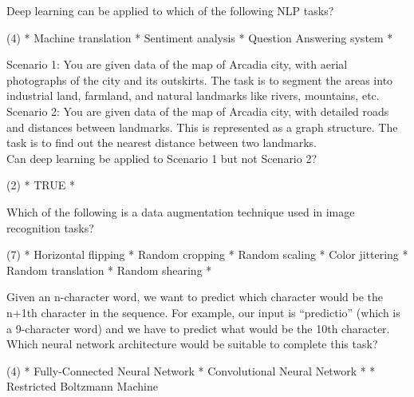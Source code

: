 \documentclass[10pt]{extarticle}
\begin{document}
\begin{exercise}
    Deep learning can be applied to which of the following NLP tasks?
    \begin{choice} (4)
        * Machine translation
        * Sentiment analysis
        * Question Answering system
        *
    \end{choice}
\end{exercise}
\begin{solution}
\end{solution}

\begin{exercise}
    Scenario 1: You are given data of the map of Arcadia city, with aerial photographs of the city and its outskirts. The task is to segment the areas into industrial land, farmland, and natural landmarks like rivers, mountains, etc. \\

    Scenario 2: You are given data of the map of Arcadia city, with detailed roads and distances between landmarks. This is represented as a graph structure. The task is to find out the nearest distance between two landmarks.\\

    Can deep learning be applied to Scenario 1 but not Scenario 2?
    \begin{choice} (2)
        * TRUE
        *
    \end{choice}
\end{exercise}
\begin{solution}
\end{solution}

\begin{exercise}
    Which of the following is a data augmentation technique used in image recognition tasks?
    \begin{choice} (7)
        * Horizontal flipping
        * Random cropping
        * Random scaling
        * Color jittering
        * Random translation
        * Random shearing
        *
    \end{choice}
\end{exercise}
\begin{solution}
\end{solution}

\begin{exercise}
    Given an n-character word, we want to predict which character would be the n+1th character in the sequence. For example, our input is “predictio” (which is a 9-character word) and we have to predict what would be the 10th character.\\

    Which neural network architecture would be suitable to complete this task?
    \begin{choice} (4)
        * Fully-Connected Neural Network
        * Convolutional Neural Network
        *
        * Restricted Boltzmann Machine
    \end{choice}
\end{exercise}
\begin{solution}
\end{solution}
\end{document}
